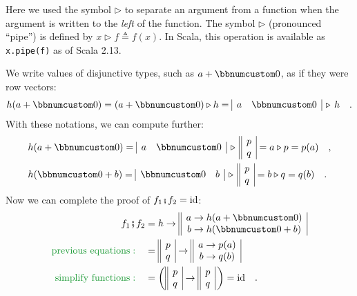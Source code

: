Here we used the symbol $\triangleright$ to separate an argument
from a function when the argument is written to the \emph{left} of
the function. The symbol $\triangleright$ (pronounced ``pipe'')
is defined by $x\triangleright f\triangleq f(x)$. In Scala, this
operation is available as \lstinline!x.pipe(f)! as of Scala 2.13.

We write values of disjunctive types, such as $a+\bbnum 0$, as if
they were row vectors:
\begin{equation}
h(a+\bbnum 0)=(a+\bbnum 0)\triangleright h=\begin{array}{|cc|}
a & \bbnum 0\end{array}\,\triangleright\,h\quad.\label{eq:forward-notation-}
\end{equation}
With these notations, we can compute further:
\begin{align*}
 & h(a+\bbnum 0)=\begin{array}{|cc|}
a & \bbnum 0\end{array}\,\triangleright\,\begin{array}{||c|}
p\\
q
\end{array}=a\triangleright p=p(a)\quad,\\
 & h(\bbnum 0+b)=\begin{array}{|cc|}
\bbnum 0 & b\end{array}\,\triangleright\,\begin{array}{||c|}
p\\
q
\end{array}=b\triangleright q=q(b)\quad.
\end{align*}
Now we can complete the proof of $f_{1}\bef f_{2}=\text{id}$:
\begin{align*}
f_{1}\bef f_{2} & =h\rightarrow\begin{array}{||c|}
a\rightarrow h(a+\bbnum 0)\\
b\rightarrow h(\bbnum 0+b)
\end{array}\\
{\color{greenunder}\text{previous equations}:}\quad & =\begin{array}{||c|}
p\\
q
\end{array}\rightarrow\begin{array}{||c|}
a\rightarrow p(a)\\
b\rightarrow q(b)
\end{array}\\
{\color{greenunder}\text{simplify functions}:}\quad & =\bigg(\begin{array}{||c|}
p\\
q
\end{array}\rightarrow\begin{array}{||c|}
p\\
q
\end{array}\,\bigg)=\text{id}\quad.
\end{align*}

